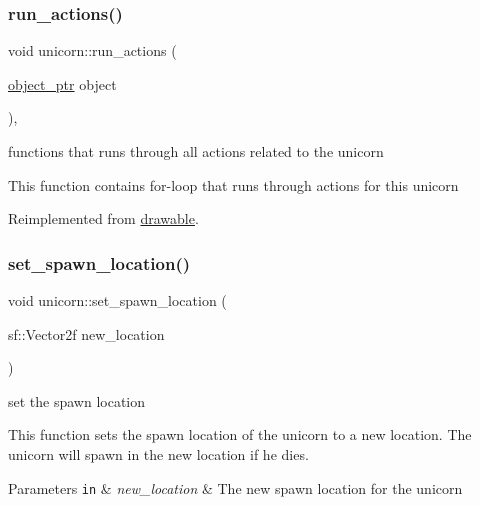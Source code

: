 \subsubsection{\texorpdfstring{run\+\_\+actions()}{run\_actions()}}
{\footnotesize\ttfamily void unicorn\+::run\+\_\+actions (\begin{DoxyParamCaption}\item[{\hyperlink{typedefs_8hpp_aab5add95f06d2ba25dbfed8eb07274fa}{object\+\_\+ptr}}]{object }\end{DoxyParamCaption})\hspace{0.3cm}{\ttfamily [override]}, {\ttfamily [virtual]}}



functions that runs through all actions related to the unicorn 

This function contains for-\/loop that runs through actions for this unicorn 

Reimplemented from \hyperlink{classdrawable_a715df01a318331e5611a2b0ad30109ff}{drawable}.

\mbox{\label{classunicorn_af0e2581c426b4b1e32f8a7b484b4e242}} 
\subsubsection{\texorpdfstring{set\+\_\+spawn\+\_\+location()}{set\_spawn\_location()}}
{\footnotesize\ttfamily void unicorn\+::set\+\_\+spawn\+\_\+location (\begin{DoxyParamCaption}\item[{sf\+::\+Vector2f}]{new\+\_\+location }\end{DoxyParamCaption})}



set the spawn location 

This function sets the spawn location of the unicorn to a new location. The unicorn will spawn in the new location if he dies.


\begin{DoxyParams}[1]{Parameters}
\mbox{\tt in}  & {\em new\+\_\+location} & The new spawn location for the unicorn \\
\hline
\end{DoxyParams}
\mbox{\label{classunicorn_af448a3fa5fc5f09254b50afa151ce42b}} 
